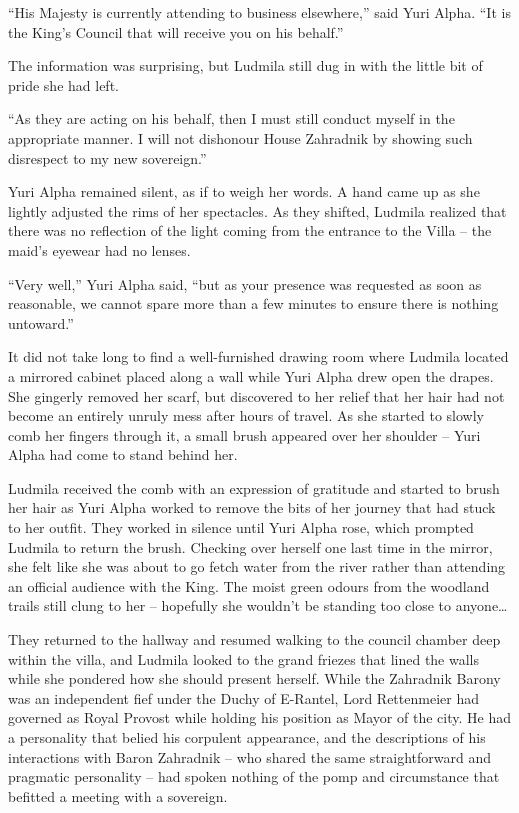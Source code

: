  

“His Majesty is currently attending to business elsewhere,” said Yuri Alpha. “It is the King’s Council that will receive you on his behalf.”

 

The information was surprising, but Ludmila still dug in with the little bit of pride she had left.

 

“As they are acting on his behalf, then I must still conduct myself in the appropriate manner. I will not dishonour House Zahradnik by showing such disrespect to my new sovereign.”

 

Yuri Alpha remained silent, as if to weigh her words. A hand came up as she lightly adjusted the rims of her spectacles. As they shifted, Ludmila realized that there was no reflection of the light coming from the entrance to the Villa – the maid’s eyewear had no lenses.

 

“Very well,” Yuri Alpha said, “but as your presence was requested as soon as reasonable, we cannot spare more than a few minutes to ensure there is nothing untoward.”

 

It did not take long to find a well-furnished drawing room where Ludmila located a mirrored cabinet placed along a wall while Yuri Alpha drew open the drapes. She gingerly removed her scarf, but discovered to her relief that her hair had not become an entirely unruly mess after hours of travel. As she started to slowly comb her fingers through it, a small brush appeared over her shoulder – Yuri Alpha had come to stand behind her.

 

Ludmila received the comb with an expression of gratitude and started to brush her hair as Yuri Alpha worked to remove the bits of her journey that had stuck to her outfit. They worked in silence until Yuri Alpha rose, which prompted Ludmila to return the brush. Checking over herself one last time in the mirror, she felt like she was about to go fetch water from the river rather than attending an official audience with the King. The moist green odours from the woodland trails still clung to her – hopefully she wouldn’t be standing too close to anyone…

 

They returned to the hallway and resumed walking to the council chamber deep within the villa, and Ludmila looked to the grand friezes that lined the walls while she pondered how she should present herself. While the Zahradnik Barony was an independent fief under the Duchy of E-Rantel, Lord Rettenmeier had governed as Royal Provost while holding his position as Mayor of the city. He had a personality that belied his corpulent appearance, and the descriptions of his interactions with Baron Zahradnik – who shared the same straightforward and pragmatic personality – had spoken nothing of the pomp and circumstance that befitted a meeting with a sovereign.


